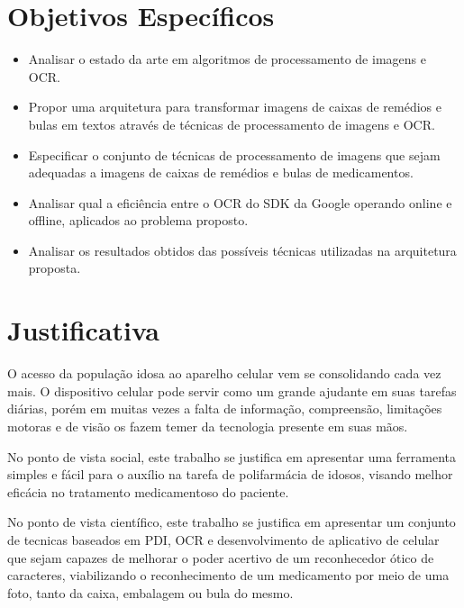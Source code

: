 \section{Objetivos Específicos}

\begin{itemize}
	\item Analisar o estado da arte em algoritmos de processamento de imagens e OCR.
	\item Propor uma arquitetura para transformar imagens de caixas de remédios e bulas em textos através de técnicas de processamento de imagens e OCR.
	\item Especificar o conjunto de técnicas de processamento de imagens que sejam adequadas a imagens de caixas de remédios e bulas de medicamentos.
	\item Analisar qual a eficiência entre o OCR do SDK da Google operando online e offline, aplicados ao problema proposto.
	\item Analisar os resultados obtidos das possíveis técnicas utilizadas na arquitetura proposta.

\end{itemize}


\section{Justificativa}




O acesso da população idosa ao aparelho celular vem se consolidando cada vez mais. O dispositivo celular pode servir como um grande ajudante em suas tarefas diárias, porém em muitas vezes a falta de informação, compreensão, limitações motoras e de visão os fazem temer da tecnologia presente em suas mãos. 

No ponto de vista social, este trabalho se justifica em apresentar uma ferramenta simples e fácil para o auxílio na tarefa de polifarmácia de idosos, visando melhor eficácia no tratamento medicamentoso do paciente.

No ponto de vista científico, este trabalho se justifica em apresentar um conjunto de tecnicas baseados em PDI, OCR e desenvolvimento de aplicativo de celular que sejam capazes de melhorar o poder acertivo de um reconhecedor ótico de caracteres, viabilizando o reconhecimento de um medicamento por meio de uma foto, tanto da caixa, embalagem ou bula do mesmo.







